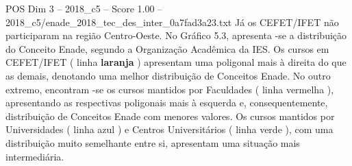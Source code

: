 \begin{textsample}{POS Dim 3 – 2018\_c5 – Score 1.00 – 2018\_c5/enade\_2018\_tec\_des\_inter\_0a7fad3a23.txt}
Já os CEFET/IFET não participaram na região Centro-Oeste.
No Gráfico 5.3, apresenta -se a distribuição do Conceito Enade, segundo a Organização Acadêmica da IES.
Os cursos em CEFET/IFET ( linha \textbf{laranja} ) apresentam uma poligonal mais à direita do que as demais, denotando uma melhor distribuição de Conceitos Enade.
No outro extremo, encontram -se os cursos mantidos por Faculdades ( linha vermelha ), apresentando as respectivas poligonais mais à esquerda e, consequentemente, distribuição de Conceitos Enade com menores valores.
Os cursos mantidos por Universidades ( linha azul ) e Centros Universitários ( linha verde ), com uma distribuição muito semelhante entre si, apresentam uma situação mais intermediária.

\end{textsample}
